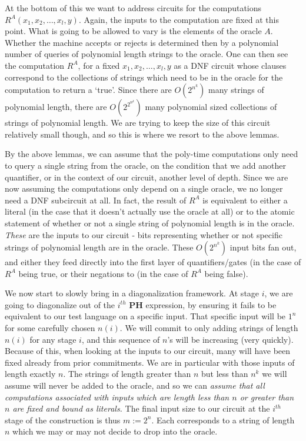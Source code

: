 \documentclass{article}
\theoremstyle{definition}
\theoremstyle{plain}
\theoremstyle{theorem}
\begin{document}
At the bottom of this we want to address circuits for the computations $R^A(x_1,x_2,\ldots,x_l,y)$. Again, the inputs to the computation are fixed at this point. What is going to be allowed to vary is the elements of the oracle $A$. Whether the machine accepts or rejects is determined then by a polynomial number of queries of polynomial length strings to the oracle. One can then see the computation $R^A$, for a fixed $x_1,x_2,\ldots,x_l,y$ as a DNF circuit whose clauses correspond to the collections of strings which need to be in the oracle for the computation to return a `true'. Since there are $O(2^{n^k})$ many strings of polynomial length, there are $O(2^{2^{n^k}})$ many polynomial sized collections of strings of polynomial length. We are trying to keep the size of this circuit relatively small though, and so this is where we resort to the above lemmas. \par 
By the above lemmas, we can assume that the poly-time computations only need to query a single string from the oracle, on the condition that we add another quantifier, or in the context of our circuit, another level of depth. Since we are now assuming the computations only depend on a single oracle, we no longer need a DNF subcircuit at all. In fact, the result of $R^A$ is equivalent to either a literal (in the case that it doesn't actually use the oracle at all) or to the atomic statement of whether or not a single string of polynomial length is in the oracle. \emph{These} are the inputs to our circuit - bits representing whether or not specific strings of polynomial length are in the oracle. These $O(2^{n^k})$ input bits fan out, and either they feed directly into the first layer of quantifiers/gates (in the case of $R^A$ being true, or their negations to (in the case of $R^A$ being false). \par 
We now start to slowly bring in a diagonalization framework. At stage $i$, we are going to diagonalize out of the $i^{th}$ $\bm{PH}$ expression, by ensuring it fails to be equivalent to our test language on a specific input. That specific input will be $1^n$ for some carefully chosen $n(i)$. We will commit to only adding strings of length $n(i)$ for any stage $i$, and this sequence of $n$'s will be increasing (very quickly). Because of this, when looking at the inputs to our circuit, many will have been fixed already from prior commitments. We are in particular with those inputs of length exactly $n$. The strings of length greater than $n$ but less than $n^k$ we will assume will never be added to the oracle, and so we can \emph{assume that all computations associated with inputs which are length less than $n$ or greater than $n$ are fixed and bound as literals.} The final input size to our circuit at the $i^{th}$ stage of the construction is thus $m := 2^n$. Each corresponds to a string of length $n$ which we may or may not decide to drop into the oracle. \par 
\end{document}
